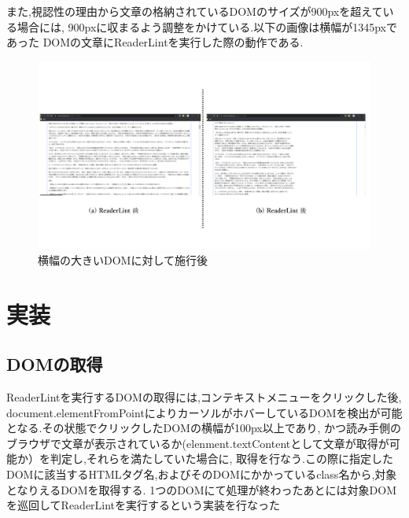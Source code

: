 また,視認性の理由から文章の格納されているDOMのサイズが900pxを超えている場合には,
900pxに収まるよう調整をかけている.以下の画像は横幅が1345pxであった
DOMの文章にReaderLintを実行した際の動作である.\footnotemark[2]


\begin{figure}[H]
    \centering
    \label{fig:image12}
    \includegraphics[width=0.8\columnwidth]{image/03/img8.png}
	\caption[幅の大きいDOMに対して施行後]{横幅の大きいDOMに対して施行後}
\end{figure}

\section{実装}

\subsection{DOMの取得}
ReaderLintを実行するDOMの取得には,コンテキストメニューをクリックした後,
document.elementFromPointによりカーソルがホバーしているDOMを検出が可能となる.その状態でクリックしたDOMの横幅が100px以上であり,
かつ読み手側のブラウザで文章が表示されているか(elenment.textContentとして文章が取得が可能か）を判定し,それらを満たしていた場合に,
取得を行なう.この際に指定したDOMに該当するHTMLタグ名,およびそのDOMにかかっているclass名から,対象となりえるDOMを取得する.
1つのDOMにて処理が終わったあとには対象DOMを巡回してReaderLintを実行するという実装を行なった

